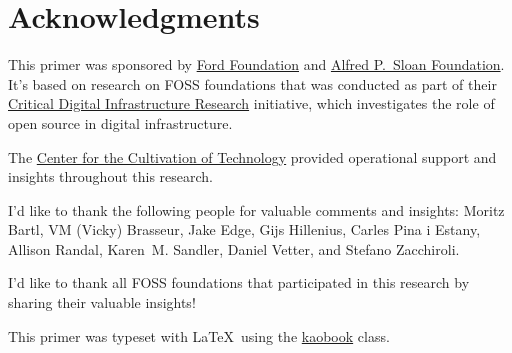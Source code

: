 


\chapter{Acknowledgments}

This primer was sponsored by \href{https://www.fordfoundation.org/}{Ford Foundation} and \href{https://sloan.org/}{Alfred P.\ Sloan Foundation}.  It's based on research on FOSS foundations that was conducted as part of their \href{https://www.fordfoundation.org/campaigns/critical-digital-infrastructure-research/}{Critical Digital Infrastructure Research} initiative, which investigates the role of open source in digital infrastructure.

The \href{https://techcultivation.org/}{Center for the Cultivation of Technology} provided operational support and insights throughout this research.

I'd like to thank the following people for valuable comments and insights: Moritz Bartl, VM (Vicky) Brasseur, Jake Edge, Gijs Hillenius, Carles Pina i Estany, Allison Randal, Karen~M. Sandler, Daniel Vetter, and Stefano Zacchiroli.

I'd like to thank all FOSS foundations that participated in this research by sharing their valuable insights!

This primer was typeset with \LaTeX\ using the \href{https://github.com/fmarotta/kaobook}{kaobook} class.

